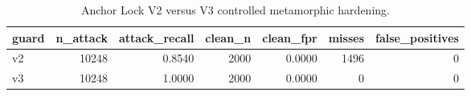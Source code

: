 \begin{table}
\caption{Anchor Lock V2 versus V3 controlled metamorphic hardening.}
\label{tab:anchor-v3}
\begin{tabular}{lrrrrrr}
\toprule
guard & n_attack & attack_recall & clean_n & clean_fpr & misses & false_positives \\
\midrule
v2 & 10248 & 0.8540 & 2000 & 0.0000 & 1496 & 0 \\
v3 & 10248 & 1.0000 & 2000 & 0.0000 & 0 & 0 \\
\bottomrule
\end{tabular}
\end{table}
